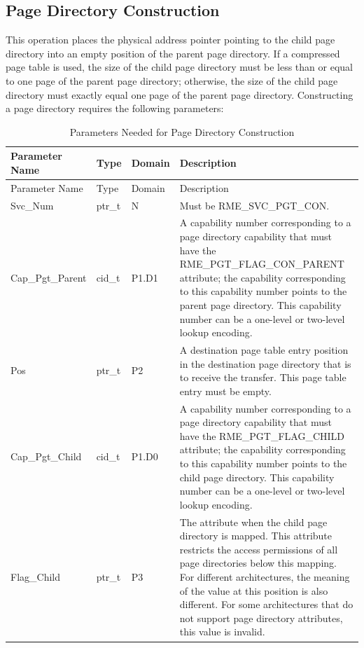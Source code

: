 \subsection{Page Directory Construction}\label{subsec:3-construct-page-directory}

This operation places the physical address pointer pointing to the child page directory into an empty position of the parent page directory. If a compressed page table is used, the size of the child page directory must be less than or equal to one page of the parent page directory; otherwise, the size of the child page directory must exactly equal one page of the parent page directory. Constructing a page directory requires the following parameters:

\begin{xltabular}{\textwidth}{@{}>{\hsize\raggedright\arraybackslash}X>{\hsize\raggedright\arraybackslash}X>{\hsize\raggedright\arraybackslash}X>{\hsize\raggedright\arraybackslash}X@{}}
\caption{Parameters Needed for Page Directory Construction}\label{tab:3-18-construct-page-directory-parameters}\\
\toprule
Parameter Name & Type & Domain & Description\tabularnewline
\endfirsthead
\toprule
Parameter Name & Type & Domain & Description\tabularnewline
\midrule
\endhead
\bottomrule
\endlastfoot
    Svc\_Num & ptr\_t & N & Must be RME\_SVC\_PGT\_CON.\tabularnewline
    Cap\_Pgt\_Parent & cid\_t & P1.D1 & A capability number corresponding to a page directory capability that must have the RME\_PGT\_FLAG\_CON\_PARENT attribute; the capability corresponding to this capability number points to the parent page directory. This capability number can be a one-level or two-level lookup encoding.\tabularnewline
    Pos & ptr\_t & P2 & A destination page table entry position in the destination page directory that is to receive the transfer. This page table entry must be empty.\tabularnewline
    Cap\_Pgt\_Child & cid\_t & P1.D0 & A capability number corresponding to a page directory capability that must have the RME\_PGT\_FLAG\_CHILD attribute; the capability corresponding to this capability number points to the child page directory. This capability number can be a one-level or two-level lookup encoding.\tabularnewline
    Flag\_Child & ptr\_t & P3 & The attribute when the child page directory is mapped. This attribute restricts the access permissions of all page directories below this mapping. For different architectures, the meaning of the value at this position is also different. For some architectures that do not support page directory attributes, this value is invalid.\tabularnewline
\end{xltabular}
\nopagebreak[4]


